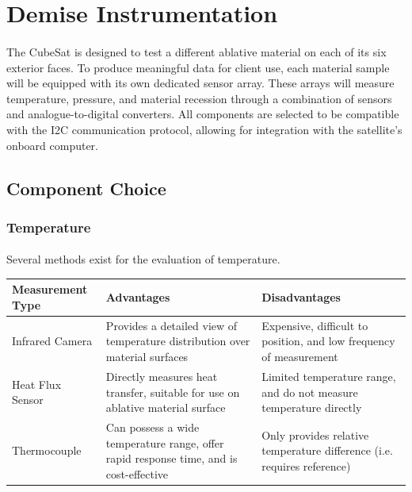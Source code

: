 \documentclass[11pt]{article}
\begin{document}
	\doublespacing
	
	\section{Demise Instrumentation}
	
	\paragraph{}The CubeSat is designed to test a different ablative material on each of its six exterior faces. To produce meaningful data for client use, each material sample will be equipped with its own dedicated sensor array. These arrays will measure temperature, pressure, and material recession through a combination of sensors and analogue-to-digital converters. All components are selected to be compatible with the I2C communication protocol, allowing for integration with the satellite’s onboard computer.
	
	\subsection{Component Choice}
	
	\subsubsection{Temperature}
	
	\paragraph{}Several methods exist for the evaluation of temperature.
	
	\begin{center}
		\begin{tabular}{|p{4cm}|p{5cm}|p{5cm}|}
			\hline
			\bf{Measurement Type} & \bf{Advantages} & \bf{Disadvantages} \\ \hline
			Infrared Camera & Provides a detailed view of temperature distribution over material surfaces & Expensive, difficult to position, and low frequency of measurement \\ \hline
			Heat Flux Sensor & Directly measures heat transfer, suitable for use on ablative material surface & Limited temperature range, and do not measure temperature directly \\ \hline
			Thermocouple & Can possess a wide temperature range, offer rapid response time, and is cost-effective & Only provides relative temperature difference (i.e. requires reference) \\ \hline
		\end{tabular}
	\end{center}
	
\end{document}
